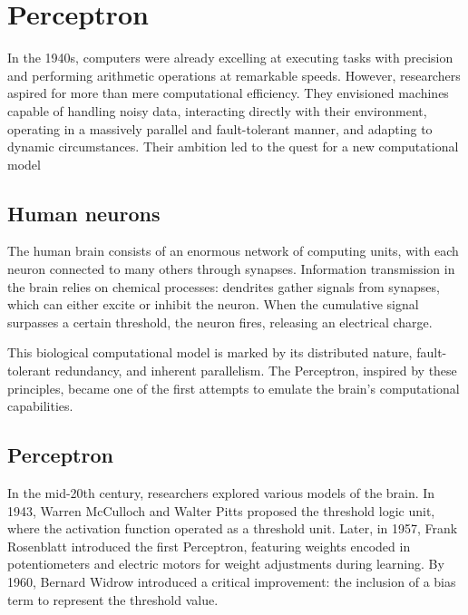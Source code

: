 \section{Perceptron}

In the 1940s, computers were already excelling at executing tasks with precision and performing arithmetic operations at remarkable speeds. 
However, researchers aspired for more than mere computational efficiency. 
They envisioned machines capable of handling noisy data, interacting directly with their environment, operating in a massively parallel and fault-tolerant manner, and adapting to dynamic circumstances.
Their ambition led to the quest for a new computational model

\subsection{Human neurons}
The human brain consists of an enormous network of computing units, with each neuron connected to many others through synapses. 
Information transmission in the brain relies on chemical processes: dendrites gather signals from synapses, which can either excite or inhibit the neuron. 
When the cumulative signal surpasses a certain threshold, the neuron fires, releasing an electrical charge.

This biological computational model is marked by its distributed nature, fault-tolerant redundancy, and inherent parallelism. 
The Perceptron, inspired by these principles, became one of the first attempts to emulate the brain's computational capabilities.

\subsection{Perceptron}
In the mid-20th century, researchers explored various models of the brain. 
In 1943, Warren McCulloch and Walter Pitts proposed the threshold logic unit, where the activation function operated as a threshold unit. 
Later, in 1957, Frank Rosenblatt introduced the first Perceptron, featuring weights encoded in potentiometers and electric motors for weight adjustments during learning. 
By 1960, Bernard Widrow introduced a critical improvement: the inclusion of a bias term to represent the threshold value.

